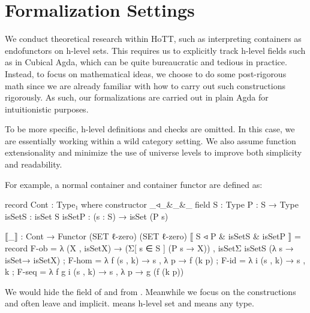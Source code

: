 \section{Formalization Settings}

We conduct theoretical research within HoTT, such as interpreting containers as endofunctors on h-level sets. This requires us to explicitly track h-level fields such as  in Cubical Agda, which can be quite bureaucratic and tedious in practice. Instead, to focus on mathematical ideas, we choose to do some post-rigorous math since we are already familiar with how to carry out such constructions rigorously. As such, our formalizations are carried out in plain Agda for intuitionistic purposes.

To be more specific, h-level definitions and checks are omitted. In this case, we are essentially working within a wild category setting. We also assume function extensionality and minimize the use of universe levels to improve both simplicity and readability.

For example, a normal container and container functor are defined as:

\begin{code}
record Cont : Type₁ where
  constructor _◃_&_&_
  field
    S : Type
    P : S → Type
    isSetS : isSet S
    isSetP : (s : S) → isSet (P s)

⟦_⟧ : Cont → Functor (SET ℓ-zero) (SET ℓ-zero)
⟦ S ◃ P & isSetS & isSetP ⟧
  = record
  { F-ob = λ (X , isSetX) → 
    (Σ[ s ∈ S ] (P s → X)) , isSetΣ isSetS (λ s → isSet→ isSetX)
  ; F-hom = λ f (s , k) → s , λ p → f (k p)
  ; F-id = λ i (s , k) → s , k
  ; F-seq = λ f g i (s , k) → s , λ p → g (f (k p))
  }
\end{code}

We would hide the field of  and  from . Meanwhile we focus on the constructions and often leave  and  implicit.  means h-level set and  means any type.